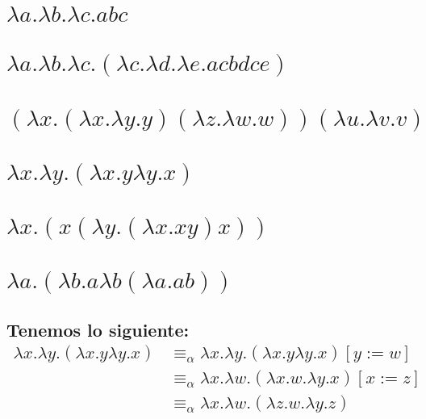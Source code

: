 \documentclass[answers]{exam}
\begin{document}
\begin{questions}
\begin{solution}
\begin{parts}
      \part{$\lambda a.\lambda b.\lambda c.abc$}
      \part{$\lambda a.\lambda b.\lambda c.(\lambda c.\lambda d.\lambda e.acbdce)$}
      \part{$(\lambda x.(\lambda x.\lambda y.y) (\lambda z.\lambda w.w)) (\lambda u.\lambda v.v)$}
    \end{parts}
  \end{solution}

    \begin{parts}
      \part{$\lambda x.\lambda y.(\lambda x.y \lambda y.x)$}
      \part{$\lambda x.(x (\lambda y.(\lambda x.x y) x))$}
      \part{$\lambda a.(\lambda b.a \lambda b (\lambda a.ab))$}
    \end{parts}
    \vspace{-1ex}
    \begin{solution}
      \begin{parts}
        \part{Tenemos lo siguiente:
          \begin{align*}
            \lambda x.\lambda y.(\lambda x.y \lambda y.x) &\equiv_{\alpha} \lambda x.\lambda y.(\lambda x.y \lambda y.x) [y:=w] \\
                                  &\equiv_{\alpha} \lambda x. \lambda w.(\lambda x.w. \lambda y.x) [x:=z] \\
                                  &\equiv_{\alpha} \lambda x. \lambda w.(\lambda z.w. \lambda y.z)
          \end{align*}}

\end{parts}
\end{solution}
\end{questions}
\end{document}
